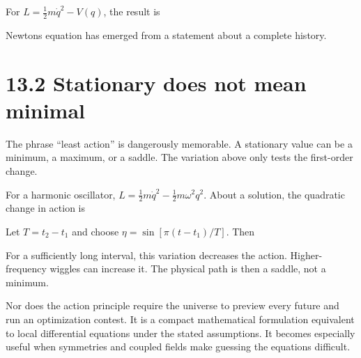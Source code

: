 \documentclass[
  11pt,
  letterpaper,
  oneside,
  openany]{scrbook}
\begin{document}
For \(L=\frac12m\dot q^2-V(q)\), the result is

\begin{center}
\begingroup
{}
\ifdim\wd\grmathbox>\linewidth
\resizebox{\linewidth}{!}{\usebox{\grmathbox}}
\else\usebox{\grmathbox}\fi
\endgroup
\end{center}

Newton\textquotesingle s equation has emerged from a statement about a
complete history.

\hypertarget{stationary-does-not-mean-minimal}{%
\section{13.2 Stationary does not mean
minimal}\label{stationary-does-not-mean-minimal}}

The phrase ``least action'' is dangerously memorable. A stationary value
can be a minimum, a maximum, or a saddle. The variation above only tests
the first-order change.

For a harmonic oscillator, \(L=\frac12m\dot q^2-\frac12m\omega^2q^2\).
About a solution, the quadratic change in action is

\begin{center}
\begingroup
{}
\ifdim\wd\grmathbox>\linewidth
\resizebox{\linewidth}{!}{\usebox{\grmathbox}}
\else\usebox{\grmathbox}\fi
\endgroup
\end{center}

Let \(T=t_2-t_1\) and choose \(\eta=\sin[\pi(t-t_1)/T]\). Then

\begin{center}
\begingroup
{}
\ifdim\wd\grmathbox>\linewidth
\resizebox{\linewidth}{!}{\usebox{\grmathbox}}
\else\usebox{\grmathbox}\fi
\endgroup
\end{center}

For a sufficiently long interval, this variation decreases the action.
Higher-frequency wiggles can increase it. The physical path is then a
saddle, not a minimum.

Nor does the action principle require the universe to preview every
future and run an optimization contest. It is a compact mathematical
formulation equivalent to local differential equations under the stated
assumptions. It becomes especially useful when symmetries and coupled
fields make guessing the equations difficult.
\end{document}
